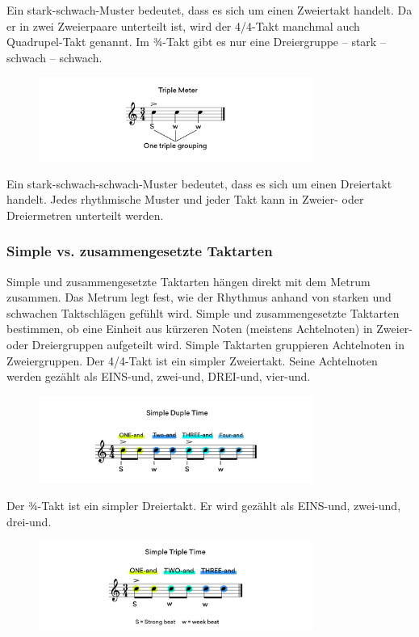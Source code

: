 Ein stark-schwach-Muster bedeutet, dass es sich um einen Zweiertakt handelt. Da er in zwei Zweierpaare unterteilt ist, wird der 4/4-Takt manchmal auch Quadrupel-Takt genannt. Im ¾-Takt gibt es nur eine Dreiergruppe – stark – schwach – schwach.

\begin{figure}[H]
    \centering
    \includegraphics[width=0.8\textwidth]{images/Rythm_body_5}
\end{figure}

Ein stark-schwach-schwach-Muster bedeutet, dass es sich um einen Dreiertakt handelt. Jedes rhythmische Muster und jeder Takt kann in Zweier- oder Dreiermetren unterteilt werden.

\subsubsection{Simple vs. zusammengesetzte Taktarten}
Simple und zusammengesetzte Taktarten hängen direkt mit dem Metrum zusammen. Das Metrum legt fest, wie der Rhythmus anhand von starken und schwachen Taktschlägen gefühlt wird. Simple und zusammengesetzte Taktarten bestimmen, ob eine Einheit aus kürzeren Noten (meistens Achtelnoten) in Zweier- oder Dreiergruppen aufgeteilt wird. Simple Taktarten gruppieren Achtelnoten in Zweiergruppen. Der 4/4-Takt ist ein simpler Zweiertakt. Seine Achtelnoten werden gezählt als EINS-und, zwei-und, DREI-und, vier-und.

\begin{figure}[H]
    \centering
    \includegraphics[width=0.8\textwidth]{images/Rythm_body_6}
\end{figure}

Der ¾-Takt ist ein simpler Dreiertakt. Er wird gezählt als EINS-und, zwei-und, drei-und.

\begin{figure}[H]
    \centering
    \includegraphics[width=0.8\textwidth]{images/Rythm_body_7}
\end{figure}

